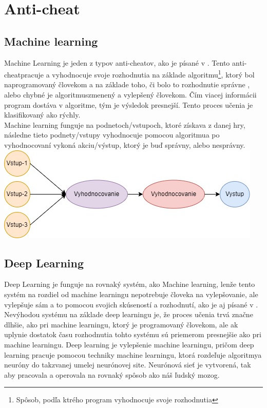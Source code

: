 \documentclass[twoside,twocolumn]{article}
\begin{document}
\section{Anti-cheat}
\subsection{Machine learning}
Machine Learning je jeden z typov anti-cheatov\footnotemark[2], ako je písané v \cite{willman2020machine}. Tento anti-cheat\footnotemark[2] pracuje a vyhodnocuje svoje rozhodnutia na základe algoritmu\footnote[7]{Spôsob, podľa ktrého program vyhodnocuje svoje rozhodnutia}, ktorý bol naprogramovaný človekom a na základe toho, či bolo to rozhodnutie správne , alebo chybné je algoritmus\footnotemark[7] zmenený a vylepšený človekom. Čím viacej informácii program dostáva v algoritme\footnotemark[7], tým je výsledok presnejší. Tento proces učenia je klasifikovaný ako rýchly. \\
Machine learning funguje na podnetoch/vstupoch, ktoré získava z danej hry, následne tieto podnety/vstupy vyhodnocuje pomocou algoritmu\footnotemark[7] a po vyhodnocovaní vykoná akciu/výstup, ktorý je buď správny, alebo nesprávny.\\

\textnormal{\includegraphics[scale=0.42]{Machine learning proces diagram.jpg}}
\label{machine learning proces}


\subsection{Deep Learning}
Deep Learning je funguje na rovnaký systém, ako Machine learning, lenže tento systém na rozdiel od machine learningu nepotrebuje človeka na vylepšovanie, ale vylepšuje sám a to pomocou svojich skúseností a rozhodnutí, ako je aj písané v \cite{zhang2021improvement}. Nevýhodou systému na základe deep learningu je, že proces učenia trvá značne dlhšie, ako pri machine learningu, ktorý je programovaný človekom, ale ak uplynie dostatok času rozhodnutia tohto systému sú priemerom presnejšie ako pri machine learningu.
Deep learning je vylepšenie machine learningu, pričom deep learning pracuje pomocou techniky machine learningu, ktorá rozdeľuje algoritmy\footnotemark[7] a neuróny do takzvanej umelej neurónovej site. Neurónová sieť je vytvorená, tak aby pracovala a operovala na rovnaký spôsob ako náš ľudský mozog.
\end{document}
